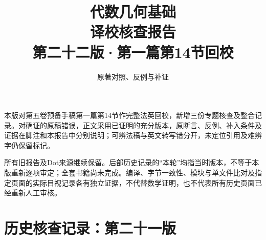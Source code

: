
\newcommand{\RR}{\mathcal R}
\newcommand{\FF}{\mathcal F}
\newcommand{\GG}{\mathcal G}
\newcommand{\MM}{\mathcal M}
\newcommand{\JJ}{\mathcal J}
\newcommand{\oldauditsrc}[1]{\par\noindent\textbf{原文位置：}#1。\par}
\newcommand{\kind}[2]{\noindent\textbf{分类：#1。}\ #2\par}
\newcommand{\lead}[1]{\par\noindent\textbf{#1}\quad}
\newenvironment{analysisproof}{\par\noindent\textbf{该轮核查的反例或补证。}\ }{\par}

\title{代数几何基础\\译校核查报告\\[1em]\large 第二十二版·第一篇第14节回校}
\author{原著对照、反例与补证}
\date{}

\frontmatter
\maketitle
{}
本版对第五卷预备手稿第一篇第14节作完整法英回校，新增三份专题核查及整合记录。对确证的原稿错误，正文采用已证明的充分版本，原断言、反例、补入条件及证据在脚注和本报告中分别说明；可辨法稿与英文转写错分开，未定位引用及难辨字仍保留标记。

所有旧报告及Dot来源继续保留。后部历史记录的“本轮”均指当时版本，不等于本版重新逐项审定；全套书籍尚未完成。编译、字节一致性、模块与单文件比对及指定页面的实际目视记录各有独立证据，不代替数学证明，也不代表所有历史页面已经重新人工审核。

\tableofcontents
\mainmatter




\setcounter{secnumdepth}{-2}
\part{历史核查记录：第二十一版}
\setcounter{secnumdepth}{2}




\setcounter{secnumdepth}{-2}
